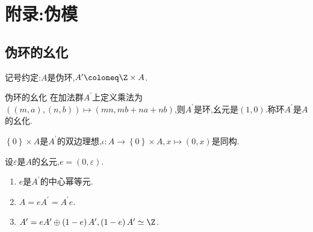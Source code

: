 \chapter*{附录:伪模}

\section{伪环的幺化}

记号约定:$A$是伪环,$A^{\prime}\coloneq\Z\times A$.

\begin{definition}{伪环的幺化}{}
	在加法群$A^{\prime}$上定义乘法为$\left(\left(m,a\right),\left(n,b\right)\right)\mapsto\left(mn,mb+na+nb\right)$,则$A^{\prime}$是环,幺元是$\left(1,0\right)$.称环$A^{\prime}$是$A$的幺化.
\end{definition}

\begin{proposition}{}{}
	$\left\{0\right\}\times A$是$A^{\prime}$的双边理想,$\iota:A\to\left\{0\right\}\times A,x\mapsto\left(0,x\right)$是同构.
\end{proposition}

\begin{proposition}{}{}
	设$\varepsilon$是$A$的幺元,$e=\left(0,\varepsilon\right)$.
	\begin{enumerate}
		\item $e$是$A^{\prime}$的中心幂等元.
		\item $A=eA^{\prime}=A^{\prime}e$.
		\item $A^{\prime}=eA^{\prime}\oplus\left(1-e\right)A^{\prime},\left(1-e\right)A^{\prime}\simeq\Z$.
	\end{enumerate}
\end{proposition}

























